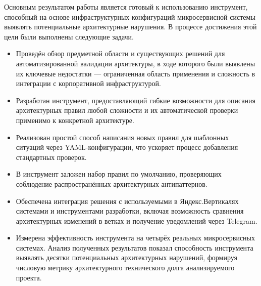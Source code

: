 
Основным результатом работы является готовый к использованию инструмент, способный на основе инфраструктурных конфигураций микросервисной системы выявлять потенциальные архитектурные нарушения. В процессе достижения этой цели были выполнены следующие задачи.

\begin{itemize}
    \item Проведён обзор предметной области и существующих решений для автоматизированной валидации архитектуры, в ходе которого были выявлены их ключевые недостатки — ограниченная область применения и сложность в интеграции с корпоративной инфраструктурой.
    \item Разработан инструмент, предоставляющий гибкие возможности для описания архитектурных правил любой сложности и их автоматической проверки применимо к конкретной архитектуре.
    \item Реализован простой способ написания новых правил для шаблонных ситуаций через YAML-конфигурации, что ускоряет процесс добавления стандартных проверок.
    \item В инструмент заложен набор правил по умолчанию, проверяющих соблюдение распространённых архитектурных антипаттернов.
    \item Обеспечена интеграция решения с используемыми в Яндекс.Вертикалях системами и инструментами разработки, включая возможность сравнения архитектурных изменений в ветках и получение уведомлений через Telegram.
    \item Измерена эффективность инструмента на четырёх реальных микросервисных системах. Анализ полученных результатов показал способность инструмента выявлять десятки потенциальных архитектурных нарушений, формируя числовую метрику архитектурного технического долга анализируемого проекта.
\end{itemize}

